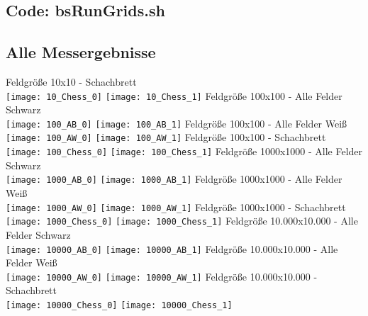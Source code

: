 \documentclass[
10pt, %
a4paper, %
oneside, %
headinclude,footinclude, %
BCOR5mm, %
]{scrartcl}
\begin{document}
\begin{appendix}
	\subsection{Code: bsRunGrids.sh}
	
	
	
	\subsection{Alle Messergebnisse}

	Feldgröße 10x10 - Schachbrett\\
	\texttt{[image: 10\_Chess\_0]} 
	\texttt{[image: 10\_Chess\_1]} 
	Feldgröße 100x100 - Alle Felder Schwarz\\
	\texttt{[image: 100\_AB\_0]} 
	\texttt{[image: 100\_AB\_1]} 
	Feldgröße 100x100 - Alle Felder Weiß\\
	\texttt{[image: 100\_AW\_0]} 
	\texttt{[image: 100\_AW\_1]} 
	Feldgröße 100x100 - Schachbrett\\
	\texttt{[image: 100\_Chess\_0]} 
	\texttt{[image: 100\_Chess\_1]} 
	Feldgröße 1000x1000 - Alle Felder Schwarz\\
	\texttt{[image: 1000\_AB\_0]} 
	\texttt{[image: 1000\_AB\_1]} 
	Feldgröße 1000x1000 - Alle Felder Weiß\\
	\texttt{[image: 1000\_AW\_0]} 
	\texttt{[image: 1000\_AW\_1]} 
	Feldgröße 1000x1000 - Schachbrett\\
	\texttt{[image: 1000\_Chess\_0]} 
	\texttt{[image: 1000\_Chess\_1]} 
	Feldgröße 10.000x10.000 - Alle Felder Schwarz\\
	\texttt{[image: 10000\_AB\_0]} 
	\texttt{[image: 10000\_AB\_1]} 
	Feldgröße 10.000x10.000 - Alle Felder Weiß\\
	\texttt{[image: 10000\_AW\_0]} 
	\texttt{[image: 10000\_AW\_1]} 
	Feldgröße 10.000x10.000 - Schachbrett\\
	\texttt{[image: 10000\_Chess\_0]} 
	\texttt{[image: 10000\_Chess\_1]} 
	
	

	

	

	
	
	
\end{appendix} 
\end{document}
